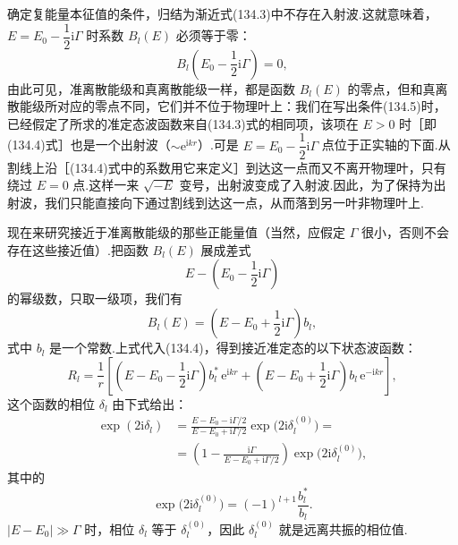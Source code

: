 确定复能量本征值的条件，归结为渐近式(134.3)中不存在入射波.这就意味着，$E=E_0-\dfrac{1}{2}\mathrm{i}\Gamma$ 时系数 $B_l(E)$ 必须等于零：
\begin{equation}
  B_l\left(E_0-\frac{1}{2}\mathrm{i}\Gamma\right)=0,
\end{equation}
由此可见，准离散能级和真离散能级一样，都是函数 $B_l(E)$ 的零点，但和真离散能级所对应的零点不同，它们并不位于物理叶上：我们在写出条件(134.5)时，已经假定了所求的准定态波函数来自(134.3)式的相同项，该项在 $E>0$ 时［即(134.4)式］也是一个出射波（$\sim\mathrm{e}^{\mathrm{i}kr}$）.可是 $E=E_0-\dfrac{1}{2}\mathrm{i}\Gamma$ 点位于正实轴的下面.从割线上沿［(134.4)式中的系数用它来定义］到达这一点而又不离开物理叶，只有绕过 $E=0$ 点.这样一来 $\sqrt{-E}$ 变号，出射波变成了入射波.因此，为了保持为出射波，我们只能直接向下通过割线到达这一点，从而落到另一叶非物理叶上.

现在来研究接近于准离散能级的那些正能量值（当然，应假定 $\Gamma$ 很小，否则不会存在这些接近值）.把函数 $B_l(E)$ 展成差式
\begin{equation*}
  E-\left(E_0-\frac{1}{2}\mathrm{i}\Gamma\right)
\end{equation*}
的幂级数，只取一级项，我们有
\begin{equation}
  B_l(E)=\left(E-E_0+\frac{1}{2}\mathrm{i}\Gamma\right)b_l,
\end{equation}
式中 $b_l$ 是一个常数.上式代入(134.4)，得到接近准定态的以下状态波函数：
\begin{equation}
  R_l=\frac{1}{r}\left[\left(E-E_0-\frac{1}{2}\mathrm{i}\Gamma\right)
  b_l^{*}\,\mathrm{e}^{\mathrm{i}kr}
  +\left(E-E_0+\frac{1}{2}\mathrm{i}\Gamma\right)
  b_l\,\mathrm{e}^{-\mathrm{i}kr}\right],
\end{equation}
这个函数的相位 $\delta_l$ 由下式给出：
\begin{equation}
\begin{aligned}
  \exp\left(2\mathrm{i}\delta_l\right)
  &=\frac{E-E_0-\mathrm{i}\Gamma/2}{E-E_0+\mathrm{i}\Gamma/2}
  \exp\bigl(2\mathrm{i}\delta_l^{(0)}\bigr)=\\
  &=\left(1-\frac{\mathrm{i}\Gamma}{E-E_0+\mathrm{i}\Gamma/2}\right)
  \exp\bigl(2\mathrm{i}\delta_l^{(0)}\bigr),
\end{aligned}
\end{equation}
其中的
\begin{equation}
  \exp\bigl(2\mathrm{i}\delta_l^{(0)}\bigr)
  =(-1)^{l+1}\frac{b_l^{*}}{b_l}.
\end{equation}
$|E-E_0|\gg\Gamma$ 时，相位 $\delta_l$ 等于 $\delta_l^{(0)}$，因此 $\delta_l^{(0)}$ 就是远离共振的相位值.

